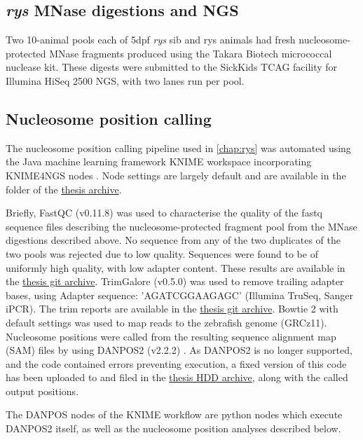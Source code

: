 \subsection{\textit{rys} MNase digestions and NGS}
Two 10-animal pools each of 5dpf \textit{rys} sib and rys animals had fresh nucleosome-protected MNase fragments produced using the Takara Biotech micrococcal nuclease kit. These digests were submitted to the SickKids TCAG  facility for Illumina HiSeq 2500 NGS, with two lanes run per pool.

\subsection{Nucleosome position calling}
\label{ssec:rysposcall}
The nucleosome position calling pipeline used in \autoref{chap:rys} was automated using the Java machine learning framework KNIME \cite{Dietz2016} workspace incorporating KNIME4NGS nodes \cite{Hastreiter2017}. Node settings are largely default and are available in the  folder of the \hyperref[sec:archive]{thesis archive}.

Briefly, FastQC (v0.11.8) \cite{Andrews2018} was used to characterise the quality of the fastq sequence files describing the nucleosome-protected fragment pool from the MNase digestions described above. No sequence from any of the two duplicates of the two pools was rejected due to low quality. Sequences were found to be of uniformly high quality, with low adapter content. These results are available in the  \hyperref[sec:archive]{thesis git archive}. TrimGalore (v0.5.0) \cite{Andrews2018a} was used to remove trailing adapter bases, using Adapter sequence: 'AGATCGGAAGAGC' (Illumina TruSeq, Sanger iPCR). The trim reports are available in the \hyperref[sec:archive]{thesis git archive}.  Bowtie 2 \cite{Langmead2012} with default settings was used to map reads to the zebrafish genome (GRCz11). Nucleosome positions were called from the resulting sequence alignment map (SAM) files by using DANPOS2 (v2.2.2) \cite{Chen2013}. As DANPOS2 is no longer supported, and the code contained errors preventing execution, a fixed version of this code has been uploaded to  and filed in the \hyperref[sec:archive]{thesis HDD archive}, along with the called output positions.

The DANPOS nodes of the KNIME workflow are python nodes which execute DANPOS2 itself, as well as the nucleosome position analyses described below. 

